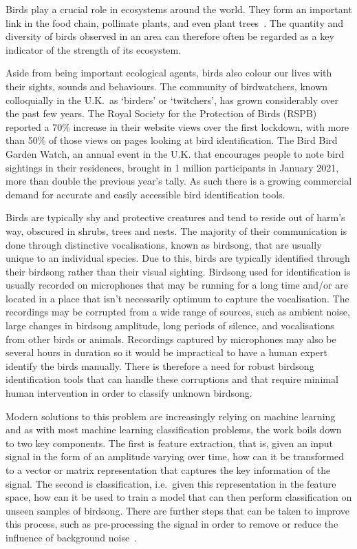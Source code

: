 Birds play a crucial role in ecosystems around the world. They form an important
link in the food chain, pollinate plants, and even plant
trees~\cite{broughton2021long}. The quantity and diversity of birds observed in
an area can therefore often be regarded as a key indicator of the strength of its
ecosystem.

Aside from being important ecological agents, birds also colour our lives with
their sights, sounds and behaviours. The community of birdwatchers, known
colloquially in the U.K.~as `birders' or `twitchers', has grown considerably
over the past few years. The Royal Society for the Protection of Birds (RSPB)
reported a 70\% increase in their website views over the first lockdown, with
more than 50\% of those views on pages looking at bird identification. The Bird
Bird Garden Watch, an annual event in the U.K. that encourages people to note
bird sightings in their residences, brought in 1 million participants in January
2021, more than double the previous year's tally. As such there is a growing
commercial demand for accurate and easily accessible bird identification tools.

Birds are typically shy and protective creatures and tend to reside out of
harm's way, obscured in shrubs, trees and nests. The majority of their
communication is done through distinctive vocalisations, known as birdsong, that
are usually unique to an individual species. Due to this, birds are typically
identified through their birdsong rather than their visual sighting. Birdsong
used for identification is usually recorded on microphones that may be running
for a long time and/or are located in a place that isn't necessarily optimum to
capture the vocalisation. The recordings may be corrupted from a wide range of
sources, such as ambient noise, large changes in birdsong amplitude, long
periods of silence, and vocalisations from other birds or animals. Recordings
captured by microphones may also be several hours in duration so it would be
impractical to have a human expert identify the birds manually. There is
therefore a need for robust birdsong identification tools that can handle these
corruptions and that require minimal human intervention in order to classify
unknown birdsong.

Modern solutions to this problem are increasingly relying on machine learning
and as with most machine learning classification problems, the work boils down
to two key components. The first is feature extraction, that is, given an input
signal in the form of an amplitude varying over time, how can it be transformed
to a vector or matrix representation that captures the key information of the
signal. The second is classification, i.e.~given this representation in the
feature space, how can it be used to train a model that can then perform
classification on unseen samples of birdsong. There are further steps that can
be taken to improve this process, such as pre-processing the signal in order to
remove or reduce the influence of background
noise~\cite{potamitis2014automatic}.

